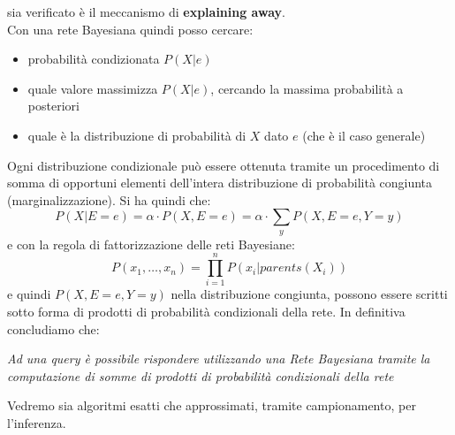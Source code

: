 \message{ !name(modprob.tex)}\documentclass[a4paper,12pt, oneside]{book}
\begin{document}
sia verificato è il meccanismo di
\textbf{explaining away}.\\
Con una rete Bayesiana quindi posso cercare:
\begin{itemize}
  \item probabilità condizionata $P(X|e)$
  \item quale valore massimizza $P(X|e)$, cercando la massima probabilità a
  posteriori
  \item quale è la distribuzione di probabilità di $X$ dato $e$ (che è il caso
  generale) 
\end{itemize}
Ogni distribuzione condizionale può essere ottenuta
tramite un procedimento di somma di opportuni elementi dell’intera distribuzione
di probabilità congiunta 
(marginalizzazione). Si ha quindi che:
\[P(X|E=e)=\alpha\cdot P(X,E=e)=\alpha\cdot \sum_y P(X,E=e, Y=y)\]
e con la regola di fattorizzazione delle reti Bayesiane:
\[P(x_1,\ldots,x_n)=\prod_{i=1}^nP(x_i|parents(X_i))\]
e quindi $P(X,E=e, Y=y)$ nella distribuzione congiunta, possono essere scritti
sotto 
forma di prodotti di probabilità condizionali della rete.
In definitiva concludiamo che:
\begin{center}
  \textit{Ad una query è possibile rispondere utilizzando una Rete Bayesiana
    tramite la computazione di 
    somme di prodotti di probabilità condizionali della rete}
\end{center}
Vedremo sia algoritmi esatti che approssimati, tramite campionamento, per
l'inferenza.\\
\end{document}
